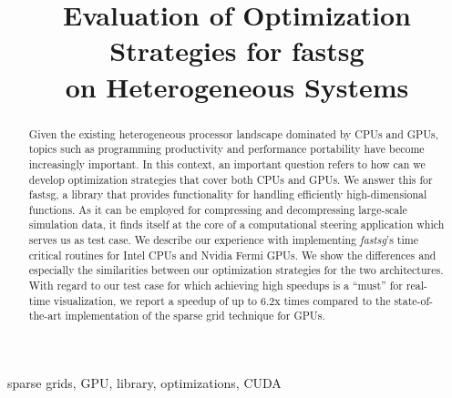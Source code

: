 \documentclass[10pt, conference]{IEEEtran}
\begin{document}
\title{Evaluation of Optimization Strategies for fastsg\\ on Heterogeneous
Systems}
\author{
\and
{}
}

\maketitle

\begin{abstract}
Given the existing heterogeneous processor landscape dominated by CPUs and GPUs,
topics such as programming productivity and performance portability have become
increasingly important. In this context, an important question refers to how can
we develop optimization strategies that cover both CPUs and GPUs. We answer this
for fastsg, a library that provides functionality for handling efficiently
high-dimensional functions. As it can be employed for compressing and
decompressing large-scale simulation data, it finds itself at the core of a
computational steering application which serves us as test case. We describe our
experience with implementing \textit{fastsg}'s time critical routines for Intel
CPUs and Nvidia Fermi GPUs. We show the differences and especially the similarities
between our optimization strategies for the two architectures. With regard to
our test case for which achieving high speedups is a ``must'' for real-time
visualization, we report a speedup of up to 6.2x times compared to the
state-of-the-art implementation of the sparse grid technique for GPUs.
\end{abstract}

\begin{IEEEkeywords}
sparse grids, GPU, library, optimizations, CUDA
\end{IEEEkeywords}



















\end{document}
